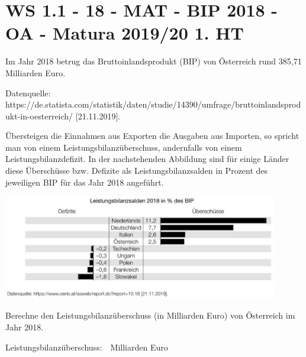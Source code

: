 \section{WS 1.1 - 18 - MAT - BIP 2018 - OA - Matura 2019/20 1. HT}

\begin{beispiel}[WS 1.1]{1}
Im Jahr 2018 betrug das Bruttoinlandsprodukt (BIP) von Österreich rund 385,71 Milliarden Euro.\\
\begin{tiny}Datenquelle: https://de.statista.com/statistik/daten/studie/14390/umfrage/bruttoinlandsprodukt-in-oesterreich/ [21.11.2019].\end{tiny}

Übersteigen die Einnahmen aus Exporten die Ausgaben aus Importen, so spricht man von einem Leistungsbilanzüberschuss, andernfalls von einem Leistungsbilanzdefizit. In der nachstehenden Abbildung sind für einige Länder diese Überschüsse bzw. Defizite als Leistungsbilanzsalden in Prozent des jeweiligen BIP für das Jahr 2018 angeführt.

\includegraphics[width=0.9\textwidth]{../_database/Bilder/WS11_18_bip.eps}

Berechne den Leistungsbilanzüberschuss (in Milliarden Euro) von Österreich im Jahr 2018.

Leistungsbilanzüberschuss:\,\,\,\, Milliarden Euro
\end{beispiel}